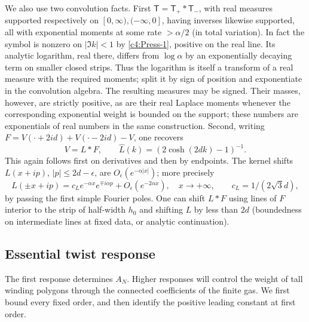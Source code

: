 We also use two convolution facts. First
\(\mathsf T=\mathsf T_+*\mathsf T_-\), with real measures supported
respectively on \([0,\infty),(-\infty,0]\), having inverses likewise
supported, all with exponential moments at some rate \(>\alpha/2\)
(in total variation). In fact the symbol is nonzero on \(|\Im k|<1\)
by \eqref{c4:Press-1}, positive on the real line. Its analytic logarithm,
real there, differs from \(\log\alpha\) by an exponentially decaying term
on smaller closed strips. Thus the logarithm is itself a transform of a
real measure with the required moments; split it by sign of position and
exponentiate in the convolution algebra. The resulting measures may be
signed. Their masses, however, are strictly positive, as are their real
Laplace moments whenever the corresponding exponential weight is bounded
on the support; these numbers are exponentials of real numbers in the
same construction. Second, writing
\(F=V(\cdot+2id)+V(\cdot-2id)-V\), one recovers
\[
       V=L*F,\qquad \widehat L(k)=(2\cosh(2dk)-1)^{-1}.
\]
This again follows first on derivatives and then by endpoints. The kernel shifts \(L(x+ip)\), \(|p|\le 2d-\epsilon\), are \(O_\epsilon(e^{-\alpha|x|})\); more precisely
\[
 L(\pm x+ip)=c_L e^{-\alpha x}e^{\mp i\alpha p}+O_\epsilon(e^{-2\alpha x}),\quad x\to+\infty,\qquad
 c_L=1/(2\sqrt3 d),
\]
by passing the first simple Fourier poles. One can shift \(L*F\) using lines of \(F\) interior to the strip of half-width \(h_0\) and shifting \(L\) by less than \(2d\) (boundedness on intermediate lines at fixed data, or analytic continuation).

\subsection{Essential twist response}\label{c4:essential-pressure}

The first response determines \(A_N\). Higher responses will control the
weight of tall winding polygons through the connected coefficients of the
finite gas. We first bound every fixed order, and then identify the
positive leading constant at first order.

